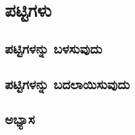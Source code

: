 \chapter{ಪಟ್ಟಿಗಳು}
\SampleProgram

\section{ಪಟ್ಟಿಗಳನ್ನು ಬಳಸುವುದು}

\section{ಪಟ್ಟಿಗಳನ್ನು ಬದಲಾಯಿಸುವುದು} 

\section{ಅಭ್ಯಾಸ }
